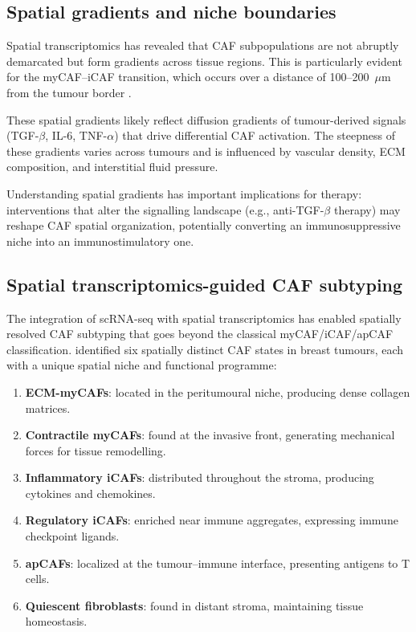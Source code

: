 \subsection{Spatial gradients and niche boundaries}

Spatial transcriptomics has revealed that CAF subpopulations are not abruptly demarcated but form gradients across tissue regions. This is particularly evident for the myCAF--iCAF transition, which occurs over a distance of 100--200~$\mu$m from the tumour border \citep{erve2024}.

These spatial gradients likely reflect diffusion gradients of tumour-derived signals (TGF-$\beta$, IL-6, TNF-$\alpha$) that drive differential CAF activation. The steepness of these gradients varies across tumours and is influenced by vascular density, ECM composition, and interstitial fluid pressure.

Understanding spatial gradients has important implications for therapy: interventions that alter the signalling landscape (e.g., anti-TGF-$\beta$ therapy) may reshape CAF spatial organization, potentially converting an immunosuppressive niche into an immunostimulatory one.

\subsection{Spatial transcriptomics-guided CAF subtyping}

The integration of scRNA-seq with spatial transcriptomics has enabled spatially resolved CAF subtyping that goes beyond the classical myCAF/iCAF/apCAF classification. \citet{erve2024} identified six spatially distinct CAF states in breast tumours, each with a unique spatial niche and functional programme:

\begin{enumerate}
  \item \textbf{ECM-myCAFs}: located in the peritumoural niche, producing dense collagen matrices.
  \item \textbf{Contractile myCAFs}: found at the invasive front, generating mechanical forces for tissue remodelling.
  \item \textbf{Inflammatory iCAFs}: distributed throughout the stroma, producing cytokines and chemokines.
  \item \textbf{Regulatory iCAFs}: enriched near immune aggregates, expressing immune checkpoint ligands.
  \item \textbf{apCAFs}: localized at the tumour--immune interface, presenting antigens to T cells.
  \item \textbf{Quiescent fibroblasts}: found in distant stroma, maintaining tissue homeostasis.
\end{enumerate}

